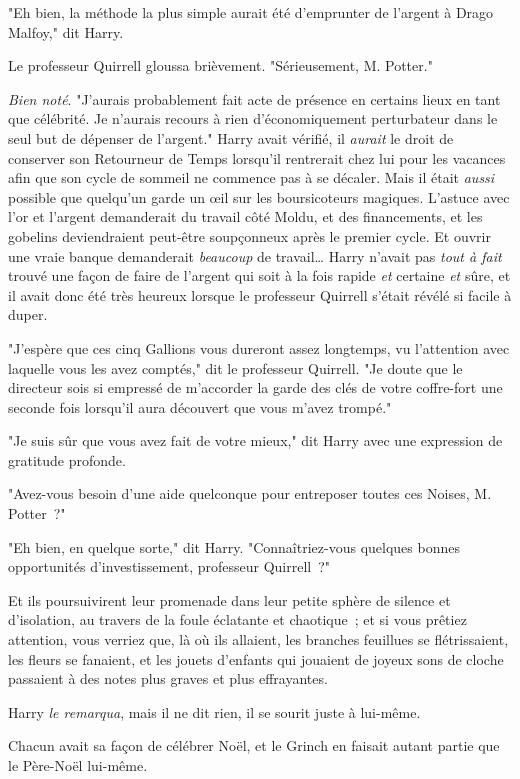 "Eh bien, la méthode la plus simple aurait été d'emprunter de l'argent à Drago Malfoy," dit Harry.

Le professeur Quirrell gloussa brièvement. "Sérieusement, M. Potter."

\emph{Bien noté}. "J'aurais probablement fait acte de présence en certains lieux en tant que célébrité. Je n'aurais recours à rien d'économiquement perturbateur dans le seul but de dépenser de l'argent." Harry avait vérifié, il \emph{aurait} le droit de conserver son Retourneur de Temps lorsqu'il rentrerait chez lui pour les vacances afin que son cycle de sommeil ne commence pas à se décaler. Mais il était \emph{aussi} possible que quelqu'un garde un œil sur les boursicoteurs magiques. L'astuce avec l'or et l'argent demanderait du travail côté Moldu, et des financements, et les gobelins deviendraient peut-être soupçonneux après le premier cycle. Et ouvrir une vraie banque demanderait \emph{beaucoup} de travail… Harry n'avait pas \emph{tout à fait} trouvé une façon de faire de l'argent qui soit à la fois rapide \emph{et} certaine \emph{et} sûre, et il avait donc été très heureux lorsque le professeur Quirrell s'était révélé si facile à duper.

"J'espère que ces cinq Gallions vous dureront assez longtemps, vu l'attention avec laquelle vous les avez comptés," dit le professeur Quirrell. "Je doute que le directeur sois si empressé de m'accorder la garde des clés de votre coffre-fort une seconde fois lorsqu'il aura découvert que vous m'avez trompé."

"Je suis sûr que vous avez fait de votre mieux," dit Harry avec une expression de gratitude profonde.

"Avez-vous besoin d'une aide quelconque pour entreposer toutes ces Noises, M. Potter~?"

"Eh bien, en quelque sorte," dit Harry. "Connaîtriez-vous quelques bonnes opportunités d'investissement, professeur Quirrell~?"

Et ils poursuivirent leur promenade dans leur petite sphère de silence et d'isolation, au travers de la foule éclatante et chaotique~; et si vous prêtiez attention, vous verriez que, là où ils allaient, les branches feuillues se flétrissaient, les fleurs se fanaient, et les jouets d'enfants qui jouaient de joyeux sons de cloche passaient à des notes plus graves et plus effrayantes.

Harry \emph{le remarqua}, mais il ne dit rien, il se sourit juste à lui-même.

Chacun avait sa façon de célébrer Noël, et le Grinch en faisait autant partie que le Père-Noël lui-même. 

